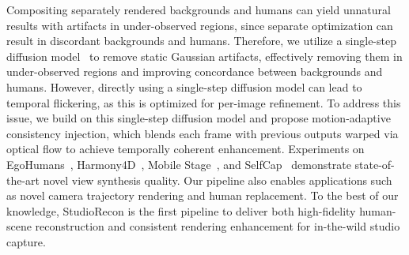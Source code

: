 \documentclass[acmtog]{acmart}
\newcommand{\ours}{StudioRecon}
\begin{document}
Compositing separately rendered backgrounds and humans can yield unnatural results with artifacts in under-observed regions, since separate optimization can result in discordant backgrounds and humans.
Therefore, we utilize a single-step diffusion model~\cite{wu2025difix3d+} to remove static Gaussian artifacts, effectively removing them in under-observed regions and improving concordance between backgrounds and humans.
However, directly using a single-step diffusion model can lead to temporal flickering, as this is optimized for per-image refinement.
To address this issue, we build on this single-step diffusion model and propose motion-adaptive consistency injection, which blends each frame with previous outputs warped via optical flow to achieve temporally coherent enhancement.
Experiments on EgoHumans~\cite{khirodkar2023ego}, Harmony4D~\cite{khirodkar2024harmony4d}, Mobile Stage~\cite{xu20244k4d}, and SelfCap~\cite{xu2024representing} demonstrate state-of-the-art novel view synthesis quality.
Our pipeline also enables applications such as novel camera trajectory rendering and human replacement.
To the best of our knowledge, \ours{} is the first pipeline to deliver both high-fidelity human-scene reconstruction and consistent rendering enhancement for in-the-wild studio capture.
\end{document}
